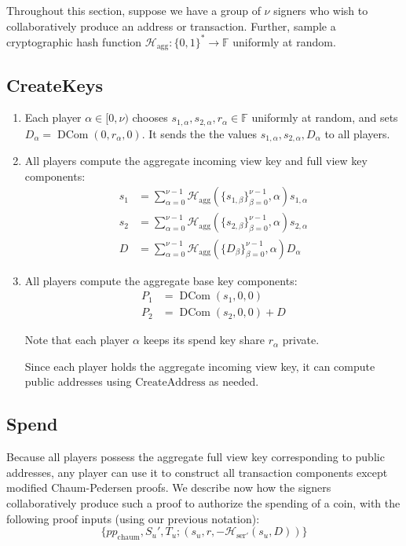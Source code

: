 \documentclass{llncs}
\newcommand{\F}{\mathbb{F}}
\newcommand{\hash}{\mathcal{H}}
\newcommand{\dcom}{\operatorname{DCom}}
\begin{document}
Throughout this section, suppose we have a group of $\nu$ signers who wish to collaboratively produce an address or transaction.
Further, sample a cryptographic hash function $\hash_{\text{agg}}: \{0,1\}^* \to \F$ uniformly at random.


\subsection{CreateKeys}

\begin{enumerate}
\item Each player $\alpha \in [0,\nu)$ chooses $s_{1,\alpha}, s_{2,\alpha}, r_\alpha \in \F$ uniformly at random, and sets $D_\alpha = \dcom(0, r_\alpha, 0)$.
It sends the the values $s_{1,\alpha}, s_{2,\alpha}, D_\alpha$ to all players.
\item All players compute the aggregate incoming view key and full view key components:
\begin{align*}
s_1 &= \sum_{\alpha=0}^{\nu-1} \hash_{\text{agg}}\left( \{s_{1,\beta}\}_{\beta=0}^{\nu-1}, \alpha \right) s_{1,\alpha} \\
s_2 &= \sum_{\alpha=0}^{\nu-1} \hash_{\text{agg}}\left( \{s_{2,\beta}\}_{\beta=0}^{\nu-1}, \alpha \right) s_{2,\alpha} \\
D &= \sum_{\alpha=0}^{\nu-1} \hash_{\text{agg}}\left( \{D_\beta\}_{\beta=0}^{\nu-1}, \alpha \right) D_\alpha
\end{align*}
\item All players compute the aggregate base key components:
\begin{align*}
P_1 &= \dcom(s_1, 0, 0) \\
P_2 &= \dcom(s_2, 0, 0) + D
\end{align*}

Note that each player $\alpha$ keeps its spend key share $r_\alpha$ private.

Since each player holds the aggregate incoming view key, it can compute public addresses using $\text{CreateAddress}$ as needed.
\end{enumerate}


\subsection{Spend}

Because all players possess the aggregate full view key corresponding to public addresses, any player can use it to construct all transaction components except modified Chaum-Pedersen proofs.
We describe now how the signers collaboratively produce such a proof to authorize the spending of a coin, with the following proof inputs (using our previous notation):
$$\{pp_{\text{chaum}}, S_u', T_u; (s_u, r, -\hash_{\text{ser}'}(s_u, D))\}$$
\end{document}
